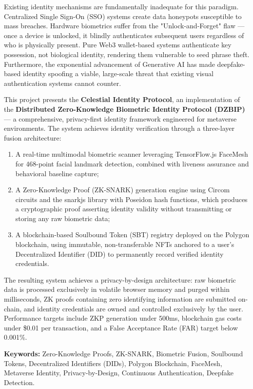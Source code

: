 \documentclass[12pt,a4paper,oneside]{report}
\begin{document}
Existing identity mechanisms are fundamentally inadequate for this paradigm. Centralized Single Sign-On (SSO) systems create data honeypots susceptible to mass breaches. Hardware biometrics suffer from the "Unlock-and-Forget" flaw --- once a device is unlocked, it blindly authenticates subsequent users regardless of who is physically present. Pure Web3 wallet-based systems authenticate key possession, not biological identity, rendering them vulnerable to seed phrase theft. Furthermore, the exponential advancement of Generative AI has made deepfake-based identity spoofing a viable, large-scale threat that existing visual authentication systems cannot counter.

This project presents the \textbf{Celestial Identity Protocol}, an implementation of the \textbf{Distributed Zero-Knowledge Biometric Identity Protocol (DZBIP)} --- a comprehensive, privacy-first identity framework engineered for metaverse environments. The system achieves identity verification through a three-layer fusion architecture:
\begin{enumerate}
    \item A real-time multimodal biometric scanner leveraging TensorFlow.js FaceMesh for 468-point facial landmark detection, combined with liveness assurance and behavioral baseline capture;
    \item A Zero-Knowledge Proof (ZK-SNARK) generation engine using Circom circuits and the snarkjs library with Poseidon hash functions, which produces a cryptographic proof asserting identity validity without transmitting or storing any raw biometric data;
    \item A blockchain-based Soulbound Token (SBT) registry deployed on the Polygon blockchain, using immutable, non-transferable NFTs anchored to a user's Decentralized Identifier (DID) to permanently record verified identity credentials.
\end{enumerate}

The resulting system achieves a privacy-by-design architecture: raw biometric data is processed exclusively in volatile browser memory and purged within milliseconds, ZK proofs containing zero identifying information are submitted on-chain, and identity credentials are owned and controlled exclusively by the user. Performance targets include ZKP generation under 500ms, blockchain gas costs under \$0.01 per transaction, and a False Acceptance Rate (FAR) target below 0.001\%.

\vspace{1cm}
\noindent
\textbf{Keywords:} Zero-Knowledge Proofs, ZK-SNARK, Biometric Fusion, Soulbound Tokens, Decentralized Identifiers (DIDs), Polygon Blockchain, FaceMesh, Metaverse Identity, Privacy-by-Design, Continuous Authentication, Deepfake Detection.
\end{document}
